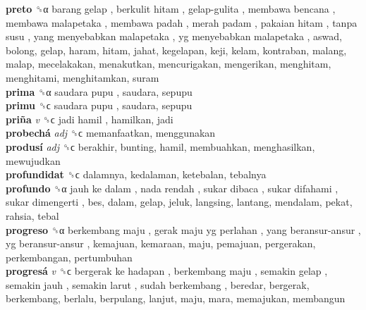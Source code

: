\textbf{preto} ␝α   barang gelap ,  berkulit hitam ,  gelap-gulita ,  membawa bencana ,  membawa malapetaka ,  membawa padah ,  merah padam ,  pakaian hitam ,  tanpa susu ,  yang menyebabkan malapetaka ,  yg menyebabkan malapetaka , aswad, bolong, gelap, haram, hitam, jahat, kegelapan, keji, kelam, kontraban, malang, malap, mecelakakan, menakutkan, mencurigakan, mengerikan, menghitam, menghitami, menghitamkan, suram  \\
\textbf{prima} ␝α   saudara pupu , saudara, sepupu  \\
\textbf{primu} ␝ϲ   saudara pupu , saudara, sepupu  \\
\textbf{priña} \emph{v}  ␝ϲ   jadi hamil , hamilkan, jadi  \\
\textbf{probechá} \emph{adj}  ␝ϲ  memanfaatkan, menggunakan  \\
\textbf{produsí} \emph{adj}  ␝ϲ  berakhir, bunting, hamil, membuahkan, menghasilkan, mewujudkan  \\
\textbf{profundidat} ␝ϲ  dalamnya, kedalaman, ketebalan, tebalnya  \\
\textbf{profundo} ␝α   jauh ke dalam ,  nada rendah ,  sukar dibaca ,  sukar difahami ,  sukar dimengerti , bes, dalam, gelap, jeluk, langsing, lantang, mendalam, pekat, rahsia, tebal  \\
\textbf{progreso} ␝α   berkembang maju ,  gerak maju yg perlahan ,  yang beransur-ansur ,  yg beransur-ansur , kemajuan, kemaraan, maju, pemajuan, pergerakan, perkembangan, pertumbuhan  \\
\textbf{progresá} \emph{v}  ␝ϲ   bergerak ke hadapan ,  berkembang maju ,  semakin gelap ,  semakin jauh ,  semakin larut ,  sudah berkembang , beredar, bergerak, berkembang, berlalu, berpulang, lanjut, maju, mara, memajukan, membangun  \\
